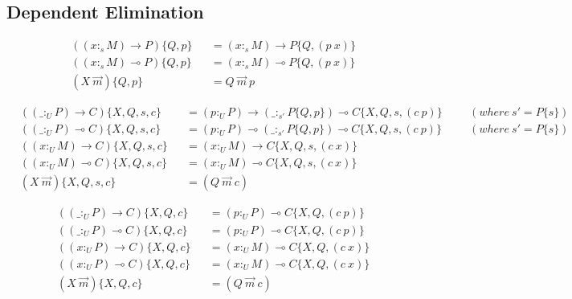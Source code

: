 \documentclass{article}
\begin{document}
\subsection{Dependent Elimination}

\begin{align*}
  & ((x :_s M) \rightarrow P)\{Q,p\} && = (x :_s M) \rightarrow P\{Q,(p\ x)\} \\
  & ((x :_s M) \multimap P)\{Q,p\} && = (x :_s M) \multimap P\{Q,(p\ x)\} \\
  & (X\ \overrightarrow{m})\{Q,p\} && = Q\ \overrightarrow{m}\ p
\end{align*}

\begin{align*}
  & ((\_ :_U P) \rightarrow C)\{X,Q,s,c\} && = (p :_U P) \rightarrow (\_ :_{s'} P\{Q,p\}) \multimap C\{X,Q,s,(c\ p)\} &&& (where\ s' = P\{s\}) \\
  & ((\_ :_U P) \multimap C)\{X,Q,s,c\} && = (p :_U P) \multimap (\_ :_{s'} P\{Q,p\}) \multimap C\{X,Q,s,(c\ p)\} &&& (where\ s' = P\{s\})\\
  & ((x :_U M) \rightarrow C)\{X,Q,s,c\} && = (x :_U M) \rightarrow C\{X,Q,s,(c\ x)\} \\
  & ((x :_U M) \multimap C)\{X,Q,s,c\} && = (x :_U M) \multimap C\{X,Q,s,(c\ x)\} \\
  & (X\ \overrightarrow{m})\{X,Q,s,c\} && = (Q\ \overrightarrow{m}\ c)
\end{align*}

\begin{align*}
  & ((\_ :_U P) \rightarrow C)\{X,Q,c\} && = (p :_U P) \multimap C\{X,Q,(c\ p)\} \\
  & ((\_ :_U P) \multimap C)\{X,Q,c\} && = (p :_U P) \multimap C\{X,Q,(c\ p)\} \\
  & ((x :_U P) \rightarrow C)\{X,Q,c\} && = (x :_U M) \multimap C\{X,Q,(c\ x)\} \\
  & ((x :_U P) \multimap C)\{X,Q,c\} && = (x :_U M) \multimap C\{X,Q,(c\ x)\} \\
  & (X\ \overrightarrow{m})\{X,Q,c\} && = (Q\ \overrightarrow{m}\ c)
\end{align*}
\end{document}

